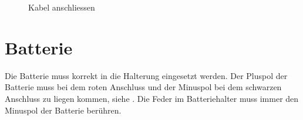 \begin{figure}[h!]
    \centering

    \caption{Kabel anschliessen}
    \label{fig:connecting_wires}
\end{figure}


\newpage
\section{Batterie}

Die Batterie muss korrekt in die Halterung eingesetzt werden.
Der Pluspol der Batterie muss bei dem roten Anschluss und der Minuspol
bei dem schwarzen Anschluss zu liegen kommen, siehe .
Die Feder im Batteriehalter muss immer den Minuspol der Batterie berühren.

